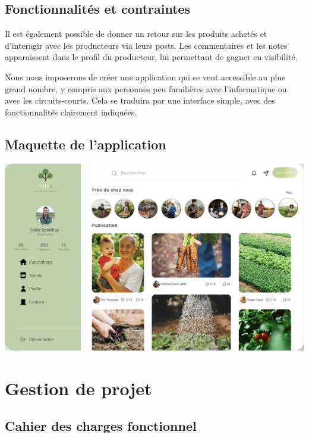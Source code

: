\documentclass[11pt]{article}
\begin{document}
\subsection{Fonctionnalités et contraintes}

Il est également possible de donner un retour sur les produits achetés et d’interagir avec les producteurs via leurs posts. Les commentaires et les notes apparaissent dans le profil du producteur, lui permettant de gagner en visibilité.

\vspace{0.2cm}

Nous nous imposerons de créer une application qui se veut accessible au plus grand nombre, y compris aux personnes peu familières avec l’informatique ou avec les circuits-courts. Cela se traduira par une interface simple, avec des fonctionnalités clairement indiquées.

\subsection{Maquette de l'application}

\begin{center}
\includegraphics[scale=0.2]{maquette.jpeg}
\end{center}

\section{Gestion de projet}

\subsection{Cahier des charges fonctionnel}
\end{document}
